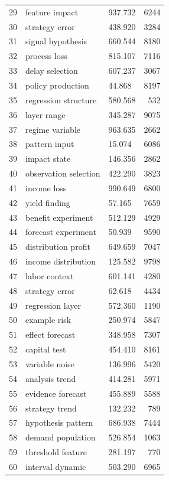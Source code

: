 \documentclass[11pt]{report}
\begin{document}
\begin{longtable}{rllr}
29 & feature impact & 937.732 & 6244 \\
30 & strategy error & 438.920 & 3284 \\
31 & signal hypothesis & 660.544 & 8180 \\
32 & process loss & 815.107 & 7116 \\
33 & delay selection & 607.237 & 3067 \\
34 & policy production & 44.868 & 8197 \\
35 & regression structure & 580.568 & 532 \\
36 & layer range & 345.287 & 9075 \\
37 & regime variable & 963.635 & 2662 \\
38 & pattern input & 15.074 & 6086 \\
39 & impact state & 146.356 & 2862 \\
40 & observation selection & 422.290 & 3823 \\
41 & income loss & 990.649 & 6800 \\
42 & yield finding & 57.165 & 7659 \\
43 & benefit experiment & 512.129 & 4929 \\
44 & forecast experiment & 50.939 & 9590 \\
45 & distribution profit & 649.659 & 7047 \\
46 & income distribution & 125.582 & 9798 \\
47 & labor context & 601.141 & 4280 \\
48 & strategy error & 62.618 & 4434 \\
49 & regression layer & 572.360 & 1190 \\
50 & example risk & 250.974 & 5847 \\
51 & effect forecast & 348.958 & 7307 \\
52 & capital test & 454.410 & 8161 \\
53 & variable noise & 136.996 & 5420 \\
54 & analysis trend & 414.281 & 5971 \\
55 & evidence forecast & 455.889 & 5588 \\
56 & strategy trend & 132.232 & 789 \\
57 & hypothesis pattern & 686.938 & 7444 \\
58 & demand population & 526.854 & 1063 \\
59 & threshold feature & 281.197 & 770 \\
60 & interval dynamic & 503.290 & 6965 \\
\end{longtable}
\end{document}
